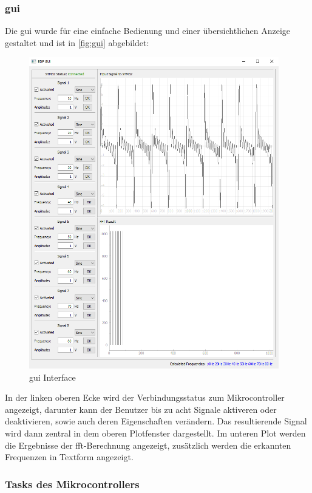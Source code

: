 \documentclass[../EDF Master Thesis.tex]{subfiles}
\begin{document}
        \clearpage
        \subsubsection{\ac{gui}}
            Die \ac{gui} wurde für eine einfache Bedienung und einer übersichtlichen Anzeige gestaltet und ist in \autoref{fig:gui} abgebildet:

            \begin{figure}[H]
                \centering
                \includegraphics[width=0.97\textwidth]{./attachments/gui.png}
                \caption{\ac{gui} Interface}
                \label{fig:gui}
            \end{figure}

        In der linken oberen Ecke wird der Verbindungsstatus zum Mikrocontroller angezeigt, darunter kann der Benutzer bis zu acht Signale aktiveren oder deaktivieren, sowie auch deren Eigenschaften verändern.
        Das resultierende Signal wird dann zentral in dem oberen Plotfenster dargestellt.
        Im unteren Plot werden die Ergebnisse der \ac{fft}-Berechnung angezeigt, zusätzlich werden die erkannten Frequenzen in Textform angezeigt.

        \subsubsection{Tasks des Mikrocontrollers}
\end{document}
